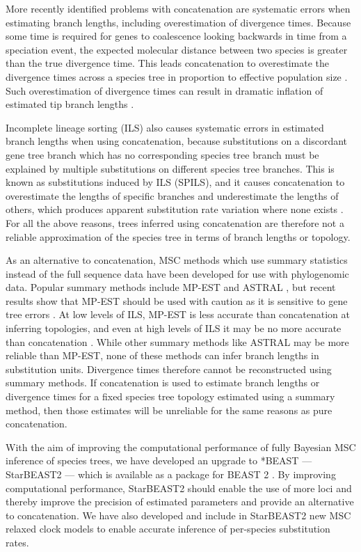 \documentclass[nogrid]{MBE}%
\begin{document}
More recently identified problems with concatenation are systematic errors when
estimating branch lengths, including overestimation of divergence times. Because
some time is required for genes to coalescence looking backwards in time from
a speciation event, the expected molecular distance between two species is
greater than the true divergence time. This leads concatenation to overestimate
the divergence times across a species tree in proportion to effective population size
\citep{Angelis874}. Such overestimation of divergence times can result in dramatic
inflation of estimated tip branch lengths \citep{Ogilvie01052016}.

Incomplete lineage sorting (ILS) also causes systematic errors in estimated
branch lengths when using concatenation, because substitutions on a discordant gene tree branch
which has no corresponding species tree branch must be explained by multiple
substitutions on different species tree branches. This is known as substitutions
induced by ILS (SPILS), and it causes concatenation to overestimate the lengths of specific
branches and underestimate the lengths of others, which produces apparent
substitution rate variation where none exists \citep{Mendes01072016}. For all
the above reasons, trees
inferred using concatenation are therefore not a reliable approximation of the
species tree in terms of branch lengths or topology.

As an alternative to concatenation, MSC methods which use summary statistics instead
of the full sequence data have been developed for use with phylogenomic data.
Popular summary methods include MP-EST and ASTRAL \citep{Liu2010,
Mirarab01092014}, but recent results show that MP-EST should be used with caution as it is
sensitive to gene tree errors \citep{Mirarab15062015, Xi201563}. At low levels of
ILS, MP-EST is less accurate than concatenation at
inferring topologies, and even at high levels of ILS it may be no more accurate
than concatenation \citep{Ogilvie01052016}. While other summary methods like
ASTRAL may be more reliable than MP-EST, none of these methods can infer branch
lengths in substitution units. Divergence times therefore cannot be
reconstructed using summary methods. If concatenation is used to estimate branch
lengths or divergence times for a fixed species tree
topology estimated using a summary method, then those estimates will be
unreliable for the same reasons as pure concatenation.

With the aim of improving the computational performance of fully Bayesian
MSC inference of species trees, we have developed an upgrade
to *BEAST --- StarBEAST2 --- which is available as a package for BEAST 2
\citep{10.1371/journal.pcbi.1003537}. By improving computational performance,
StarBEAST2 should enable the use of more loci and thereby improve the precision
of estimated parameters and provide an alternative to concatenation. We have
also developed and include in StarBEAST2 new MSC relaxed
clock models to enable accurate inference of per-species substitution rates.
\end{document}
